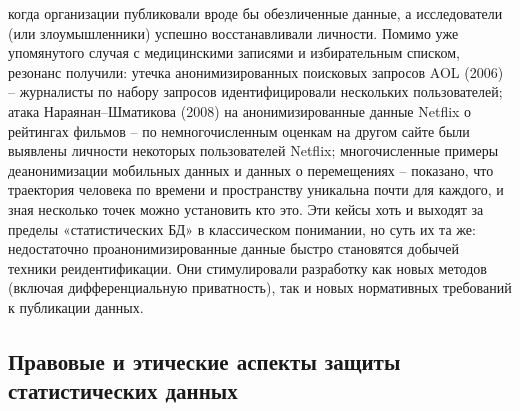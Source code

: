 когда организации публиковали вроде бы обезличенные данные, а исследователи (или злоумышленники) успешно восстанавливали личности. Помимо уже упомянутого случая с медицинскими записями и избирательным списком, резонанс получили: утечка анонимизированных поисковых запросов AOL (2006) – журналисты по набору запросов идентифицировали нескольких пользователей; атака Нараянан–Шматикова (2008) на анонимизированные данные Netflix о рейтингах фильмов – по немногочисленным оценкам на другом сайте были выявлены личности некоторых пользователей Netflix; многочисленные примеры деанонимизации мобильных данных и данных о перемещениях – показано, что траектория человека по времени и пространству уникальна почти для каждого, и зная несколько точек можно установить кто это. Эти кейсы хоть и выходят за пределы «статистических БД» в классическом понимании, но суть их та же: недостаточно проанонимизированные данные быстро становятся добычей техники реидентификации. Они стимулировали разработку как новых методов (включая дифференциальную приватность), так и новых нормативных требований к публикации данных. \subsection{Правовые и этические аспекты защиты статистических данных}
